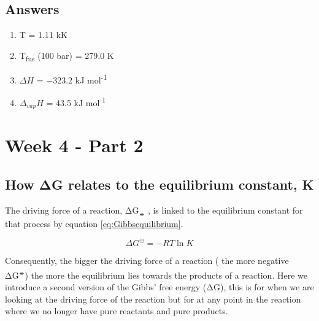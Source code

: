 \documentclass[
]{book}
\begin{document}
\hypertarget{sec:w4p1answer}{%
\section{Answers}\label{sec:w4p1answer}}

\begin{enumerate}
\def\labelenumi{\arabic{enumi}.}
\item
  T = 1.11 kK
\item
  T\textsubscript{fus} (100 bar) = 279.0 K
\item
  \(\Delta H\) = −323.2 kJ mol\textsuperscript{-1}
\item
  \(\Delta_{vap} H\) = 43.5 kJ mol\textsuperscript{-1}
\end{enumerate}

\hypertarget{ch:Part8}{%
\chapter{Week 4 - Part 2}\label{ch:Part8}}

\hypertarget{how-ux3b4g-relates-to-the-equilibrium-constant-k}{%
\section{How ΔG relates to the equilibrium constant, K}\label{how-ux3b4g-relates-to-the-equilibrium-constant-k}}

The driving force of a reaction, ΔG\textsubscript{⦵} , is linked to the equilibrium constant for that process by equation \eqref{eq:Gibbsequilibrium}.

\begin{equation}
\Delta G^\ominus = -RT \ln K
\label{eq:Gibbsequilibrium}
\end{equation}

Consequently, the bigger the driving force of a reaction ( the more negative ΔG\textsuperscript{⦵}) the more the equilibrium lies towards the products of a reaction. Here we introduce a second version of the Gibbs' free energy (ΔG), this is for when we are looking at the driving force of the reaction but for at any point in the reaction where we no longer have pure reactants and pure products.
\end{document}
